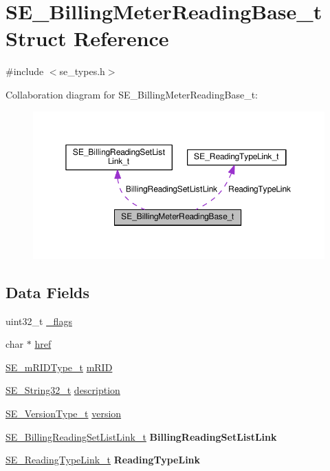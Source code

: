 \hypertarget{structSE__BillingMeterReadingBase__t}{}\section{S\+E\+\_\+\+Billing\+Meter\+Reading\+Base\+\_\+t Struct Reference}
\label{structSE__BillingMeterReadingBase__t}


{\ttfamily \#include $<$se\+\_\+types.\+h$>$}



Collaboration diagram for S\+E\+\_\+\+Billing\+Meter\+Reading\+Base\+\_\+t\+:\nopagebreak
\begin{figure}[H]
\begin{center}
\leavevmode
\includegraphics[width=350pt]{structSE__BillingMeterReadingBase__t__coll__graph}
\end{center}
\end{figure}
\subsection*{Data Fields}
\begin{DoxyCompactItemize}
\item 
uint32\+\_\+t \hyperlink{group__BillingMeterReadingBase_gaaf4d07e6731aca4df6cca42280ee9ca1}{\+\_\+flags}
\item 
char $\ast$ \hyperlink{group__BillingMeterReadingBase_gacf167cf8dec1ec50f0bf44c9a435c015}{href}
\item 
\hyperlink{group__mRIDType_gac74622112f3a388a2851b2289963ba5e}{S\+E\+\_\+m\+R\+I\+D\+Type\+\_\+t} \hyperlink{group__BillingMeterReadingBase_ga4d3e02d27b9cf9d0a4db6c1b44043dd8}{m\+R\+ID}
\item 
\hyperlink{group__String32_gac9f59b06b168b4d2e0d45ed41699af42}{S\+E\+\_\+\+String32\+\_\+t} \hyperlink{group__BillingMeterReadingBase_gad79a5edd8db86eed58f82bb771dcfb51}{description}
\item 
\hyperlink{group__VersionType_ga4b8d27838226948397ed99f67d46e2ae}{S\+E\+\_\+\+Version\+Type\+\_\+t} \hyperlink{group__BillingMeterReadingBase_gaf9273eafca8a17231e43186c95b13cb0}{version}
\item 
\hyperlink{structSE__BillingReadingSetListLink__t}{S\+E\+\_\+\+Billing\+Reading\+Set\+List\+Link\+\_\+t} {\bfseries Billing\+Reading\+Set\+List\+Link}
\item 
\hyperlink{structSE__ReadingTypeLink__t}{S\+E\+\_\+\+Reading\+Type\+Link\+\_\+t} {\bfseries Reading\+Type\+Link}
\end{DoxyCompactItemize}


